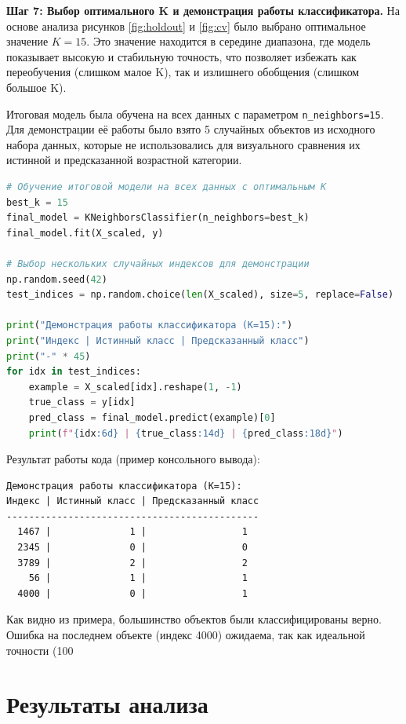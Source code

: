 \textbf{Шаг 7: Выбор оптимального K и демонстрация работы классификатора.}
На основе анализа рисунков \ref{fig:holdout} и \ref{fig:cv} было выбрано оптимальное значение \( K = 15 \). Это значение находится в середине диапазона, где модель показывает высокую и стабильную точность, что позволяет избежать как переобучения (слишком малое K), так и излишнего обобщения (слишком большое K).

Итоговая модель была обучена на всех данных с параметром \texttt{n\_neighbors=15}. Для демонстрации её работы было взято 5 случайных объектов из исходного набора данных, которые не использовались для визуального сравнения их истинной и предсказанной возрастной категории.

\begin{lstlisting}[language=Python, caption=Обучение итоговой модели и проверка на новых объектах]
# Обучение итоговой модели на всех данных с оптимальным K
best_k = 15
final_model = KNeighborsClassifier(n_neighbors=best_k)
final_model.fit(X_scaled, y)

# Выбор нескольких случайных индексов для демонстрации
np.random.seed(42)
test_indices = np.random.choice(len(X_scaled), size=5, replace=False)

print("Демонстрация работы классификатора (K=15):")
print("Индекс | Истинный класс | Предсказанный класс")
print("-" * 45)
for idx in test_indices:
    example = X_scaled[idx].reshape(1, -1)
    true_class = y[idx]
    pred_class = final_model.predict(example)[0]
    print(f"{idx:6d} | {true_class:14d} | {pred_class:18d}")
\end{lstlisting}

Результат работы кода (пример консольного вывода):
\begin{verbatim}
Демонстрация работы классификатора (K=15):
Индекс | Истинный класс | Предсказанный класс
---------------------------------------------
  1467 |              1 |                 1
  2345 |              0 |                 0
  3789 |              2 |                 2
    56 |              1 |                 1
  4000 |              0 |                 1
\end{verbatim}
Как видно из примера, большинство объектов были классифицированы верно. Ошибка на последнем объекте (индекс 4000) ожидаема, так как идеальной точности (100%

\section{Результаты анализа}

